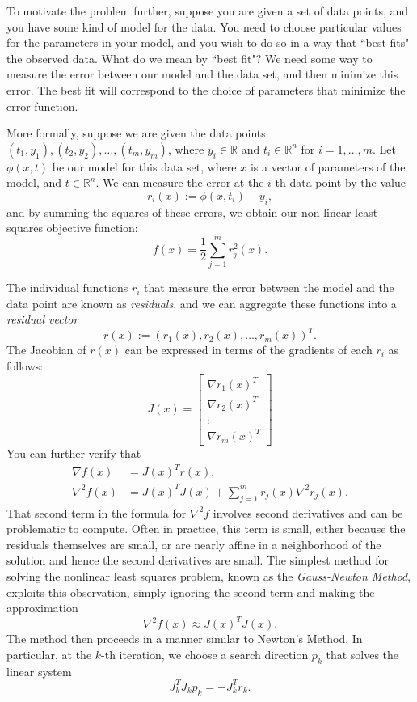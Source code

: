 To motivate the problem further, suppose you are given a set of data points, and you have some kind of model for the data.
You need to choose particular values for the parameters in your model, and you wish to do so in a way that ``best fits"
the observed data. What do we mean by ``best fit"? We need some way to measure the error between our model and the data set,
and then minimize this error. The best fit will correspond to the choice of parameters that minimize the error function.

More formally, suppose we are given the data points $(t_1, y_1), (t_2, y_2), \ldots, (t_m, y_m)$, where $y_i \in \mathbb{R}$
and $t_i \in \mathbb{R}^n$ for $i = 1, \ldots, m$. Let $\phi(x, t)$ be our model for this data set, where $x$ is
a vector of parameters of the model, and $t \in \mathbb{R}^n$. We can measure the error at the $i$-th data point by the value
$$r_i(x) := \phi(x, t_i) - y_i,$$ and by summing the squares of these errors, we obtain our non-linear least squares objective
function:
$$
f(x) = \frac{1}{2} \displaystyle \sum_{j=1}^m  r_j^2(x).
$$

The individual functions $r_i$ that measure the error between the model and the data point are known as \emph{residuals},
and we can aggregate these functions into a \emph{residual vector}
$$
r(x) := (r_1(x), r_2(x), \ldots, r_m(x))^T.
$$
The Jacobian of $r(x)$ can be expressed in terms of the gradients of each $r_i$ as follows:
$$
J(x) = \begin{bmatrix} \nabla r_1(x)^T \\ \nabla r_2(x)^T \\ \vdots \\ \nabla r_m(x)^T \end{bmatrix}
$$
You can further verify that
\begin{align*}
\nabla f(x) &= J(x)^T r(x), \\
\nabla^2 f(x) &= J(x)^TJ(x) + \displaystyle \sum_{j=1}^m r_j(x) \nabla^2r_j(x).
\end{align*}
That second term in the formula for $\nabla^2 f$ involves second derivatives and can be problematic to compute. Often in practice,
this term is small, either because the residuals themselves are small, or are nearly affine in a neighborhood of the solution and
hence the second derivatives are small.
The simplest method for solving the nonlinear least squares problem, known as the \emph{Gauss-Newton Method}, exploits this
observation, simply ignoring the second term and making the approximation
$$
\nabla^2 f(x) \approx J(x)^TJ(x).
$$
The method then proceeds in a manner similar to Newton's Method. In particular, at the $k$-th iteration, we choose a search
direction $p_k$ that solves the linear system
$$
J_k^TJ_kp_k = -J_k^Tr_k.
$$

